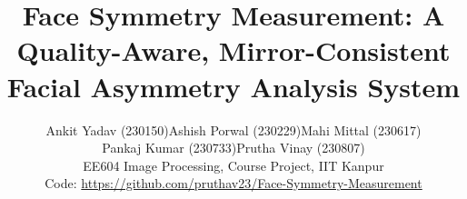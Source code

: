 \documentclass[10pt,twocolumn,letterpaper]{article}
\newcommand{\repo}{\url{https://github.com/pruthav23/Face-Symmetry-Measurement}}
\begin{document}
\title{Face Symmetry Measurement: A Quality-Aware, Mirror-Consistent\\
Facial Asymmetry Analysis System}

\author{
Ankit Yadav (230150)\quad Ashish Porwal (230229)\quad Mahi Mittal (230617)\\
Pankaj Kumar (230733)\quad Prutha Vinay (230807)\\
EE604 Image Processing, Course Project, IIT Kanpur\\
{\small Code: \repo}
}

\maketitle








{\small


}

\clearpage
\appendix

\end{document}
